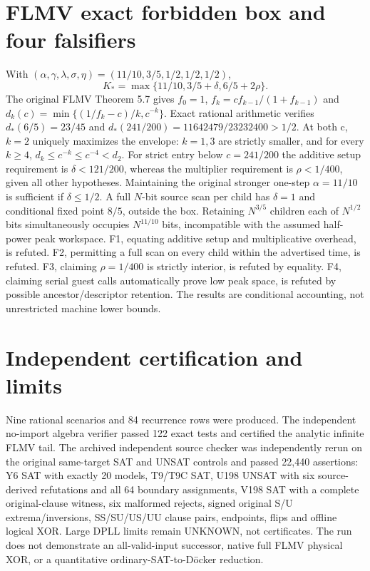 \documentclass[10pt]{article}
\begin{document}
\section{FLMV exact forbidden box and four falsifiers}
With $(\alpha,\gamma,\lambda,\sigma,\eta)=(11/10,3/5,1/2,1/2,1/2)$,
\[
K_*=\max\{11/10,3/5+\delta,6/5+2\rho\}.
\]
The original FLMV Theorem 5.7 gives $f_0=1$, $f_k=cf_{k-1}/(1+f_{k-1})$ and $d_k(c)=\min\{(1/f_k-c)/k,c^{-k}\}$. Exact rational arithmetic verifies $d_*(6/5)=23/45$ and $d_*(241/200)=11642479/23232400>1/2$. At both c, $k=2$ uniquely maximizes the envelope: $k=1,3$ are strictly smaller, and for every $k\ge4$, $d_k\le c^{-k}\le c^{-4}<d_2$.
For strict entry below $c=241/200$ the additive setup requirement is $\delta<121/200$, whereas the multiplier requirement is $\rho<1/400$, given all other hypotheses. Maintaining the original stronger one-step $\alpha=11/10$ is sufficient if $\delta\le1/2$. A full $N$-bit source scan per child has $\delta=1$ and conditional fixed point $8/5$, outside the box. Retaining $N^{3/5}$ children each of $N^{1/2}$ bits simultaneously occupies $N^{11/10}$ bits, incompatible with the assumed half-power peak workspace.
F1, equating additive setup and multiplicative overhead, is refuted. F2, permitting a full scan on every child within the advertised time, is refuted. F3, claiming $\rho=1/400$ is strictly interior, is refuted by equality. F4, claiming serial guest calls automatically prove low peak space, is refuted by possible ancestor/descriptor retention. The results are conditional accounting, not unrestricted machine lower bounds.
\section{Independent certification and limits}
Nine rational scenarios and 84 recurrence rows were produced. The independent no-import algebra verifier passed 122 exact tests and certified the analytic infinite FLMV tail. The archived independent source checker was independently rerun on the original same-target SAT and UNSAT controls and passed 22,440 assertions: Y6 SAT with exactly 20 models, T9/T9C SAT, U198 UNSAT with six source-derived refutations and all 64 boundary assignments, V198 SAT with a complete original-clause witness, six malformed rejects, signed original S/U extrema/inversions, SS/SU/US/UU clause pairs, endpoints, flips and offline logical XOR. Large DPLL limits remain UNKNOWN, not certificates. The run does not demonstrate an all-valid-input successor, native full FLMV physical XOR, or a quantitative ordinary-SAT-to-D\"ocker reduction.
\end{document}
